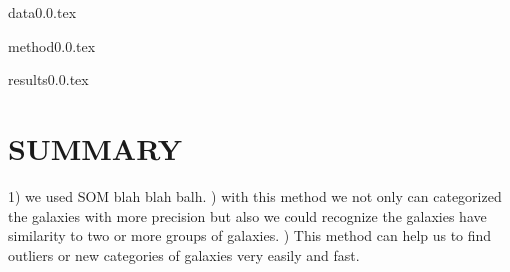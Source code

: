 \documentclass[useAMS,usenatbib]{mn2e}
\begin{document}
{data0.0.tex}


{method0.0.tex}

{results0.0.tex}


\section{SUMMARY}
\label{sec: summary}
1) we used SOM blah blah balh.
) with this method we not only can categorized the galaxies with more precision but also we could recognize the galaxies have similarity to two or more groups of galaxies.
) This method can help us to find outliers or new categories of galaxies very easily  and fast.
\end{document}
